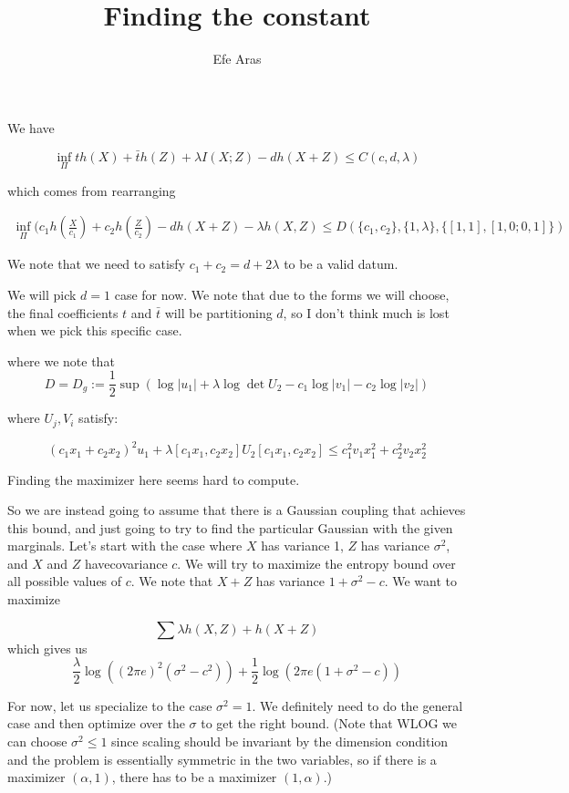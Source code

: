 \documentclass[12pt, letterpaper]{article}
\title{\textbf{Finding the constant}}
\author{Efe Aras }
\date{}
\begin{document}
\maketitle

We have

\[ \inf_\Pi th(X) + \bar{t} h(Z) + \lambda I(X;Z) - d  h(X + Z) \leq C(c, d, \lambda) \]

which comes from rearranging

\begin{align*}
	\inf_\Pi (c_1  h(\frac{X}{c_1}) + c_2  h(\frac{Z}{c_2}) - d h(X + Z) - \lambda h(X, Z) \leq D(\{c_1, c_2\}, \{1, \lambda \}, \{ [1 ,1], [1, 0; 0 ,1] \} )	
\end{align*}

We note that we need to satisfy $c_1 + c_2 = d + 2 \lambda$ to be a valid datum. 

We will pick $d = 1$ case for now. We note that due to the forms we will choose, the final coefficients $t$ and $\bar{t}$  will be partitioning $d$, so I don't think much is lost when we pick this specific case. 

where we note that \[ D = D_g := \frac{1}{2} \sup ( \log |u_1| + \lambda \log \det U_2 - c_1 \log |v_1| - c_2 \log |v_2|)  \]  

where $U_j, V_i$ satisfy:

\[  (c_1 x_1 + c_2 x_2)^2  u_1 + \lambda [c_1 x_1, c_2 x_2]  U_2 [c_1 x_1, c_2 x_2] \leq c_1^2 v_1 x_1^2 + c_2^2 v_2 x_2^2  \]

Finding the maximizer here seems hard to compute.

So we are instead going to assume that there is a Gaussian coupling that achieves this bound, and just going to try to find the particular Gaussian with the given marginals. Let's start with the case where $X$ has variance 1, $Z$ has variance $\sigma^2$, and $X$ and $Z$ havecovariance $c$. We will try to maximize the entropy bound over all possible values of $c$. We note that $X + Z$ has variance $1 + \sigma^2 - c$. We want to maximize

\[ \sum \lambda h(X, Z) + h(X + Z)\] which gives us \[ \frac{\lambda}{2} \log ((2 \pi e)^2 (\sigma^2 - c^2)) + \frac{1}{2} \log (2 \pi e (1 + \sigma^2 - c)) \]

For now, let us specialize to the case $\sigma^2 = 1$. We definitely need to do the general case and then optimize over the $\sigma$ to get the right bound. (Note that WLOG we can choose $\sigma^2 \leq 1$ since scaling should be invariant by the dimension condition and the problem is essentially symmetric in the two variables, so if there is a maximizer $(\alpha, 1)$, there has to be a maximizer $(1, \alpha)$.) 
\end{document}
